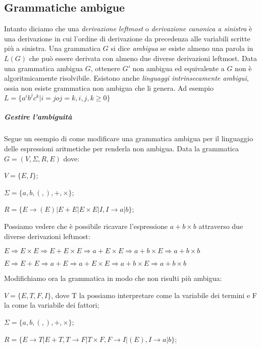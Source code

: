 \subsection{Grammatiche ambigue}
Intanto diciamo che una \emph{derivazione leftmost} o \emph{derivazione canonica a sinistra} \`e una derivazione in cui l'ordine di derivazione da precedenza alle variabili scritte pi\`u a sinistra.\newline
Una grammatica $G$ si dice \emph{ambigua} se esiste almeno una parola in $L(G)$ che pu\`o essere derivata con almeno due diverse derivazioni leftmost.\newline
Data una grammatica ambigua $G$, ottenere $G'$ non ambigua ed equivalente a $G$ non \`e algoritmicamente risolvibile.\newline
Esistono anche \emph{linguaggi intrinsecamente ambigui}, ossia non esiste grammatica non ambigua che li genera. Ad esempio $L = \{a^ib^jc^k | i=j o j=k, i, j, k \geq 0 \}$
\subparagraph{Gestire l'ambiguit\`a} Segue un esempio di come modificare una grammatica ambigua per il linguaggio delle espressioni aritmetiche per renderla non ambigua.\newline
Data la grammatica $G = (V, \Sigma, R, E)$ dove:
\begin{description}
	\item $V = \{E, I\}$;
	\item $\Sigma = \{a, b, (, ), +, \times \}$;
	\item $R = \{ E \to (E) | E + E | E \times E | I, I \to a | b\}$;	
\end{description}
Possiamo vedere che \`e possibile ricavare l'espressione $a + b \times b$ attraverso due diverse derivazioni leftmost:\newline
\begin{description}
	\item $E \Rightarrow E \times E \Rightarrow E + E \times E \Rightarrow a + E \times E \Rightarrow a + b \times E \Rightarrow a + b \times b $
	\item $E \Rightarrow E + E \Rightarrow a + E \Rightarrow a + E \times E \Rightarrow a + b \times E \Rightarrow a + b \times b $ 
\end{description}
Modifichiamo ora la grammatica in modo che non risulti pi\`u ambigua:
\begin{description}
	\item $V = \{E, T, F, I\}$, dove T la possiamo interpretare come la variabile dei termini e F la come la variabile dei fattori;
	\item $\Sigma = \{a, b, (, ), +, \times \}$;
	\item $R = \{ E \to T | E + T, T \to F | T \times F, F \to I | (E), I \to a | b\}$;	
\end{description}
